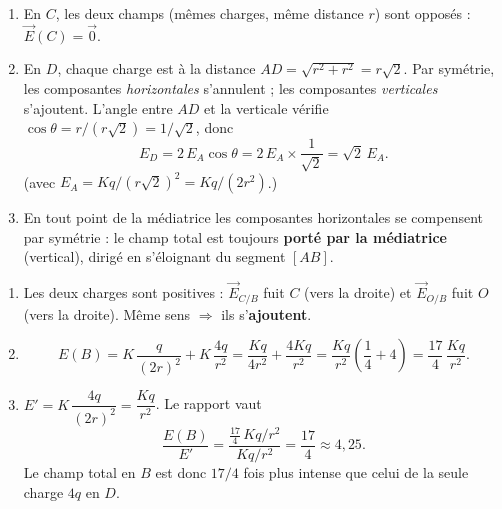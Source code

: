 \documentclass[11pt,a4paper]{article}
\newcommand{\vv}[1]{\vec{#1}}\newcommand{\ds}{\displaystyle}
\begin{document}
\begin{corrige}
\begin{enumerate}[label=\alph*)]
  \item En $C$, les deux champs (mêmes charges, même distance $r$) sont opposés :
        $\vv{E}(C) = \vv{0}$.
  \item En $D$, chaque charge est à la distance $AD = \sqrt{r^2 + r^2} = r\sqrt2$. Par symétrie, les
        composantes \emph{horizontales} s'annulent ; les composantes \emph{verticales} s'ajoutent.
        L'angle entre $AD$ et la verticale vérifie $\cos\theta = r/(r\sqrt2) = 1/\sqrt2$, donc
        \[ E_D = 2\,E_A\cos\theta = 2\,E_A\times\frac{1}{\sqrt2} = \sqrt2\,E_A. \]
        (avec $E_A = Kq/(r\sqrt2)^2 = Kq/(2r^2)$.)
  \item En tout point de la médiatrice les composantes horizontales se compensent par symétrie : le
        champ total est toujours \textbf{porté par la médiatrice} (vertical), dirigé en s'éloignant
        du segment $[AB]$.
\end{enumerate}
\end{corrige}

\begin{corrige}
\begin{enumerate}[label=\alph*)]
  \item Les deux charges sont positives : $\vv{E}_{C/B}$ fuit $C$ (vers la droite) et
        $\vv{E}_{O/B}$ fuit $O$ (vers la droite). Même sens $\Rightarrow$ ils s'\textbf{ajoutent}.
  \item \[ E(B) = K\,\frac{q}{(2r)^2} + K\,\frac{4q}{r^2}
             = \frac{Kq}{4r^2} + \frac{4Kq}{r^2}
             = \frac{Kq}{r^2}\!\left(\frac14 + 4\right) = \frac{17}{4}\,\frac{Kq}{r^2}. \]
  \item $E' = K\,\dfrac{4q}{(2r)^2} = \dfrac{Kq}{r^2}$. Le rapport vaut
        \[ \frac{E(B)}{E'} = \frac{\tfrac{17}{4}\,Kq/r^2}{Kq/r^2} = \frac{17}{4} \approx 4{,}25. \]
        Le champ total en $B$ est donc $17/4$ fois plus intense que celui de la seule charge $4q$
        en $D$.
\end{enumerate}
\end{corrige}
\end{document}

